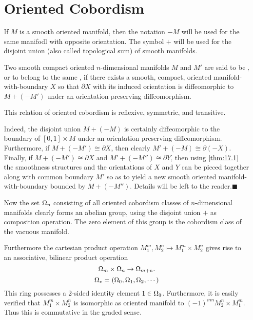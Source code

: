 \documentclass[../main]{subfiles}
\begin{document}
\section{Oriented Cobordism}
If $M$ is a smooth oriented manifold, then the notation $-M$ will be used for the same manifodl with opposite orientation. The symbol $+$ will be used for the disjoint union (also called topological sum) of smooth manifolds.
\begin{definition}
Two smooth compact oriented $n$-dimensional manifolds $M$ and $M'$ are said to be , or to belong to the same , if there exists a smooth, compact, oriented manifold-with-boundary $X$ so that $\partial X$ with its induced orientation is diffeomorphic to $M + (-M')$ under an orientation preserving diffeomorphism.
\end{definition}
\begin{lemma}
\label{lem:17.02}
This relation of oriented cobordism is reflexive, symmetric, and transitive.
\end{lemma}
Indeed, the disjoint union $M+(-M)$ is certainly diffeomorphic to the boundary of $[0,1] \times M$ under an orientation preserving diffeomorphism. Furthermore, if $M+(-M') \cong \partial X$, then clearly $M' + (-M) \cong \partial(-X)$. Finally, if $M+(-M') \cong \partial X$ and $M' + (-M'') \cong \partial Y$, then using \ref{thm:17.1} the smoothness structures and the orientations of $X$ and $Y$ can be pieced together along with common boundary $M'$ so as to yield a new smooth oriented manifold-with-boundary bounded by $M+(-M'')$. Details will be left to the reader.\ensuremath{\blacksquare}

Now the set $\Omega_n$ consisting of all oriented cobordism classes of $n$-dimensional manifolds clearly forms an abelian group, using the disjoint union $+$ as composition operation. The zero element of this group is the cobordism class of the vacuous manifold.

Furthermore the cartesian product operation $M_1^m, M_2^n \mapsto M_1^m \times M_2^n$ gives rise to an associative, bilinear product operation \[\Omega_m \times \Omega_n \rightarrow \Omega_{m+n}.\]  \[\Omega_\ast = (\Omega_0, \Omega_1, \Omega_2,\cdots)\]  This ring possesses a $2$-sided identity element $1 \in \Omega_0$. Furthermore, it is easily verified that $M_1^m \times M_2^n$ is isomorphic as oriented manifold to $(-1)^{mn}M_2^n \times M_1^m$. Thus this  is commutative in the graded sense.
\end{document}
